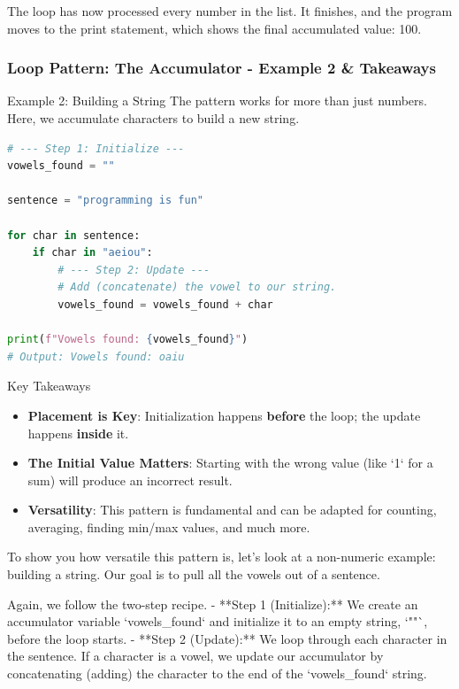 \documentclass{beamer}
\begin{document}
\begin{frame}[fragile]
\begin{note}
    The loop has now processed every number in the list. It finishes, and the program moves to the print statement, which shows the final accumulated value: 100.
    \end{note}
\end{frame}

\begin{frame}[fragile]
    \frametitle{Loop Pattern: The Accumulator - Example 2 \& Takeaways}
    
    \begin{block}{Example 2: Building a String}
        The pattern works for more than just numbers. Here, we accumulate characters to build a new string.
        \begin{lstlisting}[language=Python, caption=Finding Vowels]
# --- Step 1: Initialize ---
vowels_found = ""

sentence = "programming is fun"

for char in sentence:
    if char in "aeiou":
        # --- Step 2: Update ---
        # Add (concatenate) the vowel to our string.
        vowels_found = vowels_found + char

print(f"Vowels found: {vowels_found}")
# Output: Vowels found: oaiu
        \end{lstlisting}
    \end{block}
    
    \vfill
    
    \begin{alertblock}{Key Takeaways}
        \begin{itemize}
            \item \textbf{Placement is Key}: Initialization happens \textbf{before} the loop; the update happens \textbf{inside} it.
            \item \textbf{The Initial Value Matters}: Starting with the wrong value (like `1` for a sum) will produce an incorrect result.
            \item \textbf{Versatility}: This pattern is fundamental and can be adapted for counting, averaging, finding min/max values, and much more.
        \end{itemize}
    \end{alertblock}

    \begin{note}
    To show you how versatile this pattern is, let's look at a non-numeric example: building a string. Our goal is to pull all the vowels out of a sentence.
    
    Again, we follow the two-step recipe.
    - **Step 1 (Initialize):** We create an accumulator variable `vowels_found` and initialize it to an empty string, `""`, before the loop starts.
    - **Step 2 (Update):** We loop through each character in the sentence. If a character is a vowel, we update our accumulator by concatenating (adding) the character to the end of the `vowels_found` string.
    

\end{note}
\end{frame}
\end{document}
